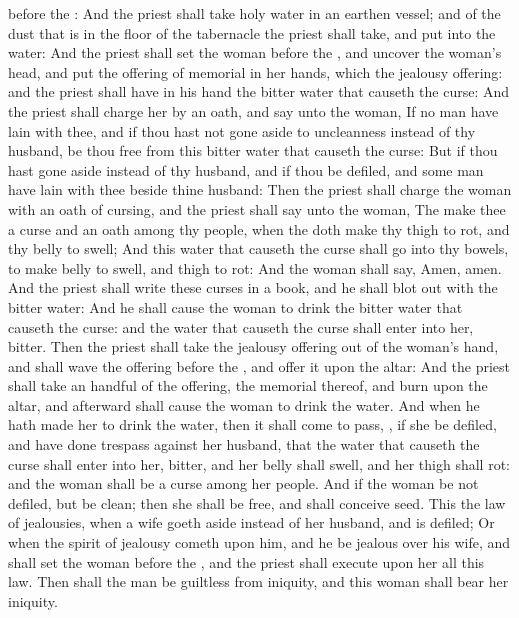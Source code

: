 {before the
{}:
And the
priest shall
take
holy
water in an
earthen
vessel; and of the
dust that is in the
floor of the
tabernacle the
priest shall
take, and
put
{} into the
water:
And the
priest shall
set the
woman
before the
{}, and
uncover the
woman’s
head, and
put the
offering of
memorial in her
hands, which
{} the
jealousy
offering: and the
priest shall have in his
hand the
bitter
water that causeth the
curse:
And the
priest shall charge her by an
oath, and
say unto the
woman, If no
man have
lain with thee, and if thou hast not gone
aside to
uncleanness
{} instead of thy
husband, be thou
free from this
bitter
water that causeth the
curse:
But if thou hast gone
aside
{} instead of thy
husband, and if thou be
defiled, and some
man
have
lain with thee
beside thine
husband:
Then the
priest shall
charge the
woman with an
oath of
cursing, and the
priest shall
say unto the
woman, The
{}
make thee a
curse and an
oath
among thy
people, when the
{} doth
make thy
thigh to
rot, and thy
belly to
swell;
And this
water that causeth the
curse shall
go into thy
bowels, to make
{}
belly to
swell, and
{}
thigh to
rot: And the
woman shall
say,
Amen,
amen.
And the
priest shall
write these
curses in a
book, and he shall
blot
{} out with the
bitter
water:
And he shall cause the
woman to
drink the
bitter
water that causeth the
curse: and the
water that causeth the
curse shall
enter into her,
{}
bitter.
Then the
priest shall
take the
jealousy
offering out of the
woman’s
hand, and shall
wave the
offering
before the
{}, and
offer it upon the
altar:
And the
priest shall take an
handful of the
offering,
{} the
memorial thereof, and
burn
{} upon the
altar, and
afterward shall cause the
woman to
drink the
water.
And when he hath made her to
drink the
water, then it shall come to pass,
{}, if she be
defiled, and have
done
trespass against her
husband, that the
water that causeth the
curse shall
enter into her,
{}
bitter, and her
belly shall
swell, and her
thigh shall
rot: and the
woman shall be a
curse
among her
people.
And if the
woman be not
defiled, but be
clean; then she shall be
free, and shall
conceive
seed.
This
{} the
law of
jealousies, when a
wife goeth
aside
{} instead of her
husband, and is
defiled;
Or when the
spirit of
jealousy
cometh upon
him, and he be
jealous over his
wife, and shall
set the
woman
before the
{}, and the
priest shall
execute upon her all this
law.
Then shall the
man be
guiltless from
iniquity, and
this
woman shall
bear her
iniquity.

}
